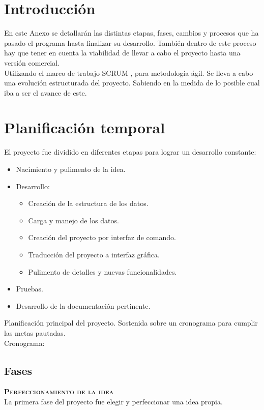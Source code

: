 
\section{Introducción}
En este Anexo se detallarán las distintas etapas, fases, cambios y procesos que ha pasado el programa hasta finalizar su desarrollo. También dentro de este proceso hay que tener en cuenta la viabilidad de llevar a cabo el proyecto hasta una versión comercial.
\\
Utilizando el marco de trabajo SCRUM \cite{scrum}, para metodología ágil. Se lleva a cabo una evolución estructurada del proyecto. Sabiendo en la medida de lo posible cual iba a ser el avance de este.
\\

\section{Planificación temporal}
El proyecto fue dividido en diferentes etapas para lograr un desarrollo constante:
\begin{itemize}
\item Nacimiento y pulimento de la idea.
\item Desarrollo:
\begin{itemize}
\item Creación de la estructura de los datos.
\item Carga y manejo de los datos.
\item Creación del proyecto por interfaz de comando.
\item Traducción del proyecto a interfaz gráfica.
\item Pulimento de detalles y nuevas funcionalidades.
\end{itemize}
\item Pruebas.
\item Desarrollo de la documentación pertinente.
\end{itemize}
Planificación principal del proyecto. Sostenida sobre un cronograma para cumplir las metas pautadas.\\
Cronograma:

\subsection{Fases}
\textbf{\textsc{Perfeccionamiento de la idea}}\\
La primera fase del proyecto fue elegir y perfeccionar una idea propia.\\


